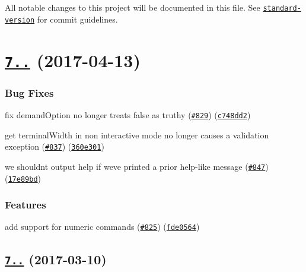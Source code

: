 All notable changes to this project will be documented in this file. See \href{https://github.com/conventional-changelog/standard-version}{\tt standard-\/version} for commit guidelines.

\label{_7.1.0}%
 \section*{\href{https://github.com/yargs/yargs/compare/v7.0.2...v7.1.0}{\tt 7..} (2017-\/04-\/13)}

\subsubsection*{Bug Fixes}


\begin{DoxyItemize}
\item fix demand\+Option no longer treats \textquotesingle{}false\textquotesingle{} as truthy (\href{https://github.com/yargs/yargs/issues/829}{\tt \#829}) (\href{https://github.com/yargs/yargs/commit/c748dd2}{\tt c748dd2})
\item get terminal\+Width in non interactive mode no longer causes a validation exception (\href{https://github.com/yargs/yargs/issues/837}{\tt \#837}) (\href{https://github.com/yargs/yargs/commit/360e301}{\tt 360e301})
\item we shouldn\textquotesingle{}t output help if we\textquotesingle{}ve printed a prior help-\/like message (\href{https://github.com/yargs/yargs/issues/847}{\tt \#847}) (\href{https://github.com/yargs/yargs/commit/17e89bd}{\tt 17e89bd})
\end{DoxyItemize}

\subsubsection*{Features}


\begin{DoxyItemize}
\item add support for numeric commands (\href{https://github.com/yargs/yargs/issues/825}{\tt \#825}) (\href{https://github.com/yargs/yargs/commit/fde0564}{\tt fde0564})
\end{DoxyItemize}

\label{_7.0.2}%
 \subsection*{\href{https://github.com/yargs/yargs/compare/v7.0.1...v7.0.2}{\tt 7..} (2017-\/03-\/10)}

